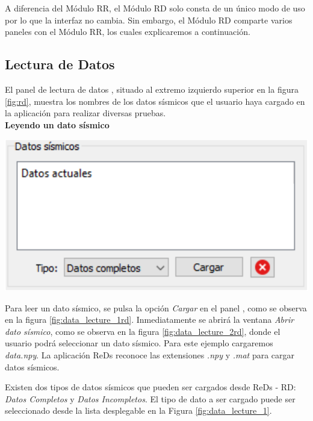 \documentclass[12pt,twoside,letter]{ol-softwaremanual}
\newcommand*\circled[1]{\tikz[baseline=(char.base)]{
            \node[shape=circle,draw,inner sep=2pt] (char) {#1};}}
\newenvironment{Figure}
  {\par\medskip\noindent\minipage{\linewidth}}
  {\endminipage\par\medskip}
\begin{document}
A diferencia del Módulo RR, el Módulo RD solo consta de un único modo de uso por lo que la interfaz no cambia. Sin embargo, el Módulo RD comparte varios paneles con el Módulo RR, los cuales explicaremos a continuación.

\subsection{Lectura de Datos}

El panel de lectura de datos \circled{1}, situado al extremo izquierdo superior en la figura \ref{fig:rd}, muestra los nombres de los datos sísmicos que el usuario haya cargado en la aplicación para realizar diversas pruebas.\\

\textbf{Leyendo un dato sísmico} \label{sec:data_lecturerd}

\begin{multicols}{2}
	
	\begin{Figure}
		\centering
		\includegraphics[width=.9\linewidth]{data-lecture-1.pdf}
		\label{fig:data_lecture_1rd}
	\end{Figure}
	
	Para leer un dato sísmico, se pulsa la opción \emph{Cargar} en el panel \circled{1}, como se observa en la figura \ref{fig:data_lecture_1rd}. Inmediatamente se abrirá la ventana \textit{Abrir dato sísmico}, como se observa en la figura \ref{fig:data_lecture_2rd}, donde el usuario podrá seleccionar un dato sísmico. Para este ejemplo cargaremos \emph{data.npy}.
	La aplicación ReDs reconoce las extensiones \emph{.npy} y \emph{.mat} para cargar datos sísmicos.
	
\end{multicols}

Existen dos tipos de datos sísmicos que pueden ser cargados desde ReDs - RD: \textit{Datos Completos} y \textit{Datos Incompletos}. El tipo de dato a ser cargado puede ser seleccionado desde la lista desplegable en la Figura \ref{fig:data_lecture_1}.
\end{document}

